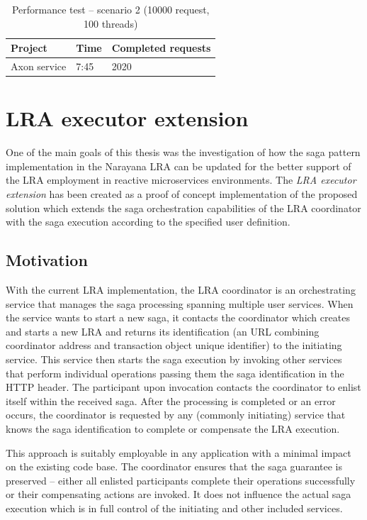 \documentclass[oneside,
  digital, %
  table,   %
  nolof,     %
  nolot,     %
]{fithesis3}
\begin{document}
\begin{table}[h]
    \begin{tabularx}{\textwidth}{XXX}
        \toprule
        Project & Time & Completed requests \\
        \midrule
        Axon service & 7:45 & 2020 \\
        \bottomrule
    \end{tabularx}
    \caption{Performance test -- scenario 2 (10000 request, 100 threads)}
    \label{tab:performance-scenario-2}
\end{table}

\clearpage
\chapter{LRA executor extension}

One of the main goals of this thesis was the investigation of how the saga pattern implementation in the Narayana LRA can be updated for the better support of the LRA employment in reactive microservices environments. The \textit{LRA executor extension} has been created as a proof of concept implementation of the proposed solution which extends the saga orchestration capabilities of the LRA coordinator with the saga execution according to the specified user definition.

\section{Motivation}

With the current LRA implementation, the LRA coordinator is an orchestrating service that manages the saga processing spanning multiple user services. When the service wants to start a new saga, it contacts the coordinator which creates and starts a new LRA and returns its identification (an URL combining coordinator address and transaction object unique identifier) to the initiating service. This service then starts the saga execution by invoking other services that perform individual operations passing them the saga identification in the HTTP header. The participant upon invocation contacts the coordinator to enlist itself within the received saga. After the processing is completed or an error occurs, the coordinator is requested by any (commonly initiating) service that knows the saga identification to complete or compensate the LRA execution.

This approach is suitably employable in any application with a minimal impact on the existing code base. The coordinator ensures that the saga guarantee is preserved -- either all enlisted participants complete their operations successfully or their compensating actions are invoked. It does not influence the actual saga execution which is in full control of the initiating and other included services.
\end{document}
